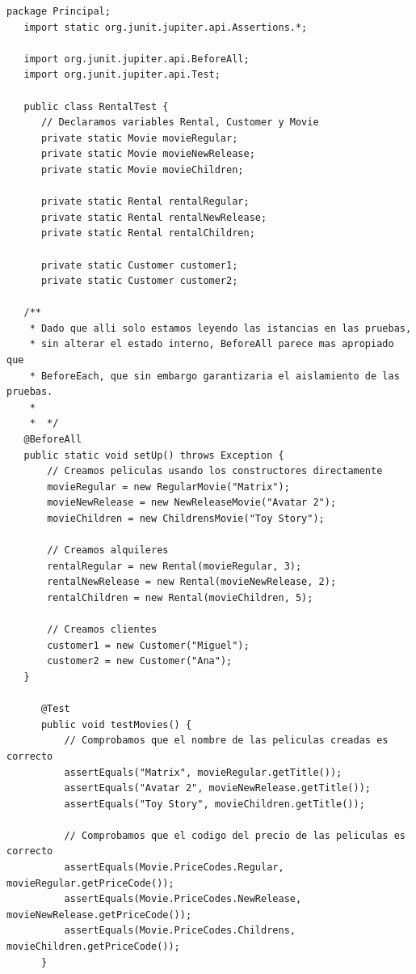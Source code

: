 \lstset{language=Java}
\begin{lstlisting}[caption={RentalTest.java}]
   package Principal;
   import static org.junit.jupiter.api.Assertions.*;
   
   import org.junit.jupiter.api.BeforeAll;
   import org.junit.jupiter.api.Test;
   
   public class RentalTest {
      // Declaramos variables Rental, Customer y Movie
      private static Movie movieRegular;
      private static Movie movieNewRelease;
      private static Movie movieChildren;
      
      private static Rental rentalRegular;
      private static Rental rentalNewRelease;
      private static Rental rentalChildren;
      
      private static Customer customer1;
      private static Customer customer2;
   
   /**
    * Dado que alli solo estamos leyendo las istancias en las pruebas,
    * sin alterar el estado interno, BeforeAll parece mas apropiado que
    * BeforeEach, que sin embargo garantizaria el aislamiento de las pruebas.
    * 
    *  */
   @BeforeAll
   public static void setUp() throws Exception {
       // Creamos peliculas usando los constructores directamente
       movieRegular = new RegularMovie("Matrix");
       movieNewRelease = new NewReleaseMovie("Avatar 2");
       movieChildren = new ChildrensMovie("Toy Story");
       
       // Creamos alquileres
       rentalRegular = new Rental(movieRegular, 3);
       rentalNewRelease = new Rental(movieNewRelease, 2);
       rentalChildren = new Rental(movieChildren, 5);
       
       // Creamos clientes
       customer1 = new Customer("Miguel");
       customer2 = new Customer("Ana");
   }
      
      @Test
      public void testMovies() {
          // Comprobamos que el nombre de las peliculas creadas es correcto
          assertEquals("Matrix", movieRegular.getTitle());
          assertEquals("Avatar 2", movieNewRelease.getTitle());
          assertEquals("Toy Story", movieChildren.getTitle());
          
          // Comprobamos que el codigo del precio de las peliculas es correcto
          assertEquals(Movie.PriceCodes.Regular, movieRegular.getPriceCode());
          assertEquals(Movie.PriceCodes.NewRelease, movieNewRelease.getPriceCode());
          assertEquals(Movie.PriceCodes.Childrens, movieChildren.getPriceCode());
      }
      

\end{lstlisting}
